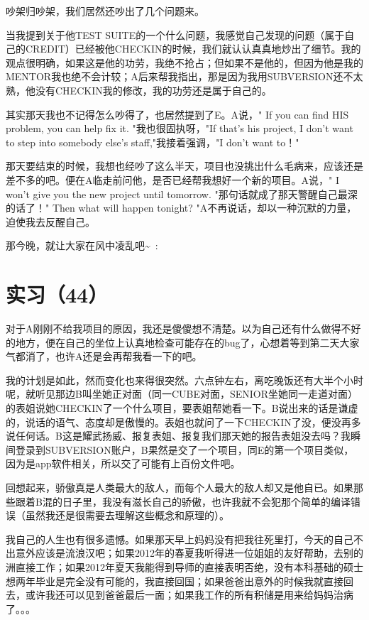 \documentclass[12pt]{book}
\begin{document}
吵架归吵架，我们居然还吵出了几个问题来。

当我提到关于他TEST SUITE的一个什么问题，我感觉自己发现的问题（属于自己的CREDIT）已经被他CHECKIN的时候，我们就认认真真地炒出了细节。我的观点很明确，如果这是他的功劳，我绝不抢占；但如果不是他的，但因为他是我的MENTOR我也绝不会计较；A后来帮我指出，那是因为我用SUBVERSION还不太熟，他没有CHECKIN我的修改，我的功劳还是属于自己的。

其实那天我也不记得怎么吵得了，也居然提到了E。A说，" If you can find HIS problem, you can help fix it. "我也很固执呀，"If that's his project, I don't want to step into somebody else's staff,"我接着强调，"I don't want to！"

那天要结束的时候，我想也经吵了这么半天，项目也没挑出什么毛病来，应该还是差不多的吧。便在A临走前问他，是否已经帮我想好一个新的项目。A说，" I won't give you the new project until tomorrow. "那句话就成了那天警醒自己最深的话了！" Then what will happen tonight? "A不再说话，却以一种沉默的力量，迫使我去反醒自己。

那今晚，就让大家在风中凌乱吧\textasciitilde{}~:


\section{实习（44）}
\label{sec-5-47}

对于A刚刚不给我项目的原因，我还是傻傻想不清楚。以为自己还有什么做得不好的地方，便在自己的坐位上认真地检查可能存在的bug了，心想着等到第二天大家气都消了，也许A还是会再帮我看一下的吧。

我的计划是如此，然而变化也来得很突然。六点钟左右，离吃晚饭还有大半个小时呢，就听见那边B叫坐她正对面（同一CUBE对面，SENIOR坐她同一走道对面）的表姐说她CHECKIN了一个什么项目，要表姐帮她看一下。B说出来的话是谦虚的，说话的语气、态度却是傲慢的。表姐也就问了一下CHECKIN了没，便没再多说任何话。B这是耀武扬威、报复表姐、报复我们那天她的报告表姐没去吗？我瞬间登录到SUBVERSION账户，B果然是交了一个项目，同E的第一个项目类似，因为是app软件相关，所以交了可能有上百份文件吧。

回想起来，骄傲真是人类最大的敌人，而每个人最大的敌人却又是他自已。如果那些跟着B混的日子里，我没有滋长自己的骄傲，也许我就不会犯那个简单的编译错误（虽然我还是很需要去理解这些概念和原理的）。

我自己的人生也有很多遗憾。如果那天早上妈妈没有把我往死里打，今天的自己不出意外应该是流浪汉吧；如果2012年的春夏我听得进一位姐姐的友好帮助，去别的洲直接工作；如果2012年夏天我能得到导师的直接表明否绝，没有本科基础的硕士想两年毕业是完全没有可能的，我直接回国；如果爸爸出意外的时候我就直接回去，或许我还可以见到爸爸最后一面；如果我工作的所有积储是用来给妈妈治病了。。。
\end{document}
